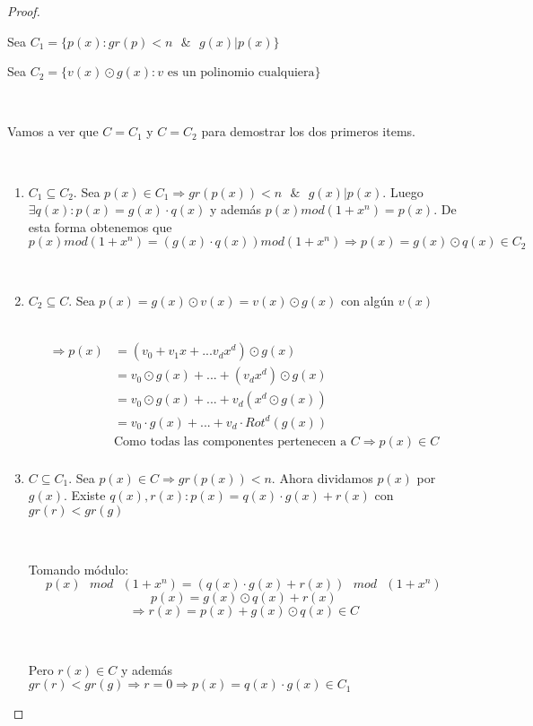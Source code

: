 \documentclass[11pt]{article}
\begin{document}
\begin{proof} \par
\

Sea $C_1 =  \{p(x): gr(p) < n \text{ } \& \text{ }  g(x)|p(x)\}$
\

Sea $C_2 = \{v(x) \odot g(x):  \text{$v$ es un polinomio cualquiera} \}$\par
\

Vamos a ver que $C = C_1$ y $C = C_2$ para demostrar los dos primeros items.\par
\

\begin{enumerate}
\item $C_1 \subseteq C_2$. Sea $p(x) \in C_1 \Rightarrow gr(p(x)) < n \text{ } \& \text{ } g(x) | p(x)$. Luego $\exists q(x): p(x) = g(x)\cdot q(x)$ y además $p(x) mod (1 + x^{n}) = p(x)$. De esta forma obtenemos que  $p(x) mod (1 + x^{n}) =  (g(x)\cdot q(x)) mod (1 + x^{n}) \Rightarrow p(x) = g(x) \odot q(x) \in C_2 $\par
\

\item $C_2 \subseteq C$. Sea  $p(x) = g(x) \odot v(x) =  v(x) \odot g(x)$ con algún $v(x)$\par
\
\begin{align*}
\Rightarrow p(x) & = (v_0 + v_1x + ... v_dx^{d}) \odot g(x) \\
			 & = v_0 \odot g(x) + ... + (v_dx^{d}) \odot g(x)\\
			 & = v_0 \odot g(x) + ... + v_d(x^{d} \odot g(x))\\
			 & = v_0 \cdot g(x) + ... + v_d \cdot Rot^{d}(g(x))\\
			 & \text{Como todas las componentes pertenecen a } C \Rightarrow p(x) \in C\\
\end{align*}

\item $C \subseteq C_1$. Sea $p(x) \in C \Rightarrow gr(p(x)) < n$. Ahora dividamos $p(x)$ por $g(x)$. Existe $q(x), r(x): p(x) = q(x) \cdot g(x) + r(x)$ con $gr(r) < gr(g)$\par
\

Tomando módulo: \[ p(x) \text{ } mod \text{ } (1 + x^{n}) =  (q(x) \cdot g(x) + r(x)) \text{ }  mod \text{ } (1 + x^{n}) \] \[ p(x) = g(x) \odot q(x) + r(x)\] \[ \Rightarrow r(x) = p(x) +  g(x) \odot q(x) \in C\] \par
\

Pero $r(x) \in C$ y además $gr(r) < gr(g) \Rightarrow r = 0 \Rightarrow p(x) = q(x) \cdot g(x) \in C_1$


\end{enumerate}
\end{proof}
\end{document}
